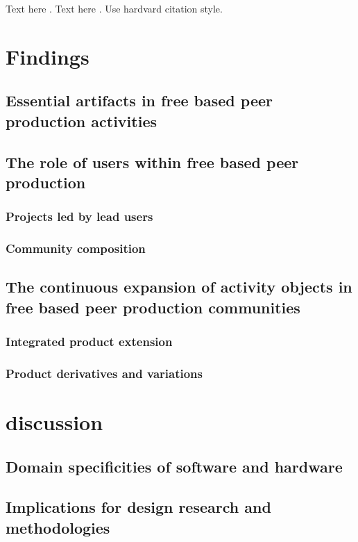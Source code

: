 \documentclass{ICED-Paper}%
\begin{document}
Text here \citep{ConcreteMath}.
Text here \citep{p2pEconomy}.
Use hardvard citation style.

\section{Findings}
\subsection{Essential artifacts in free based peer production activities}

\subsection{The role of users within free based peer production}

\subsubsection{Projects led by lead users}

\subsubsection{Community composition}

\subsection{The continuous expansion of activity objects in free based peer production communities}

\subsubsection{Integrated product extension}

\subsubsection{Product derivatives and variations}

\section{discussion}
\subsection{Domain specificities of software and hardware}

\subsection{Implications for design research and methodologies}
\end{document}
